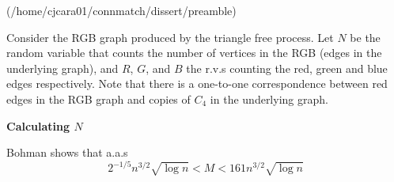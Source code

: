 (/home/cjcara01/connmatch/dissert/preamble)



Consider the RGB graph produced by the triangle free process.  Let $N$ be the random variable that counts the number of vertices in the RGB (edges in the underlying graph), and $R$, $G$, and $B$ the r.v.s counting the red, green and blue edges respectively.  Note that there is a one-to-one correspondence between red edges in the RGB graph and copies of $C_4$ in the underlying graph.

\noindent\textbf{Calculating $N$}

Bohman shows that a.a.s \[2^{-1/5}n^{3/2}\sqrt{\log n} < M < 161n^{3/2}\sqrt{\log n}  \]


